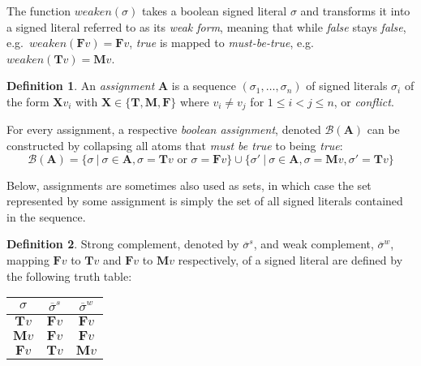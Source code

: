 \documentclass{vutinfth} %
\theoremstyle{example}
\theoremstyle{definition}
\newtheorem{definition}{Definition}[section]
\theoremstyle{theorem}
\theoremstyle{lemma}
\theoremstyle{corollary}
\newtheorem*{remark}{Remark}
\newcommand{\mbt}{must-be-true}
\newcommand{\negstrong}[1]{\overline{#1}^s}
\newcommand{\negweak}[1]{\overline{#1}^w}
\newcommand{\bass}{\mathcal{B}}
\newcommand{\ass}{\mathbf{A}}
\newcommand{\bT}{\mathbf{T}}
\newcommand{\bM}{\mathbf{M}}
\newcommand{\bF}{\mathbf{F}}
\newcommand{\bX}{\mathbf{X}}
\newcommand{\thrice}{{\{\bT, \bM, \bF \}}}
\newcommand{\wkn}{\textit{weaken}}
\begin{document}
The function $\wkn(\sigma)$ takes a boolean signed literal $\sigma$ and transforms it into a signed literal referred to as its \emph{weak form}, meaning that while \emph{false} stays \emph{false}, e.g.~$\wkn(\bF v) = \bF v$, \emph{true} is mapped to \emph{\mbt}, e.g.~$\wkn(\bT v) = \bM v$.


\begin{definition}
An \emph{assignment} $\ass$ is a sequence $(\sigma_1, \ldots, \sigma_n)$ of signed literals $\sigma_i$ of the form $\bX v_i$ with $\bX \in \thrice$ where $v_i \not = v_j$ for $1 \leq i < j \leq n$, or \emph{conflict}.

For every assignment, a respective \emph{boolean assignment}, denoted $\bass(\ass)$ can be constructed by collapsing all atoms that \emph{must be true} to being \emph{true}:$$\bass(\ass) = \{ \sigma \ | \ \sigma \in \ass, \sigma = \mathbf{T}v \textrm{ or } \sigma = \mathbf{F}v \} \cup \{ \sigma' \ | \ \sigma \in \ass, \sigma = \mathbf{M}v, \sigma' = \mathbf{T}v \}$$
\end{definition}

Below, assignments are sometimes also used as sets, in which case the set represented by some assignment is simply the set of all signed literals contained in the sequence.

\begin{definition}
Strong complement, denoted by $\negstrong{\sigma}$, and weak complement, $\negweak{\sigma}$, mapping $\mathbf{F}v$ to $\mathbf{T}v$ and $\mathbf{F}v$ to $\mathbf{M}v$ respectively, of a signed literal are defined by the following truth table:%

\begin{center}
\begin{tabular}{|c|cc|}
\hline
$\sigma$&$\negstrong{\sigma}$&$\negweak{\sigma}$\\
\hline
\hline
$\mathbf{T}v$&$\mathbf{F}v$&$\mathbf{F}v$\\
$\mathbf{M}v$&$\mathbf{F}v$&$\mathbf{F}v$\\
$\mathbf{F}v$&$\mathbf{T}v$&$\mathbf{M}v$\\
\hline
\end{tabular}
\end{center}
\end{definition}
\end{document}
